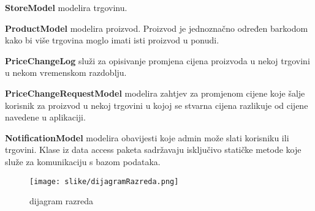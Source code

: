 			\textbf{StoreModel} modelira trgovinu. 
			
			\textbf{ProductModel} modelira proizvod. Proizvod je jednoznačno određen barkodom kako bi više trgovina moglo imati isti proizvod u ponudi. 
			
			\textbf{PriceChangeLog} služi za opisivanje promjena cijena proizvoda u nekoj trgovini u nekom vremenskom razdoblju. 
			
			\textbf{PriceChangeRequestModel} modelira zahtjev za promjenom cijene koje šalje korisnik za proizvod u nekoj trgovini u kojoj se stvarna cijena razlikuje od cijene navedene u aplikaciji.  
			
			\textbf{NotificationModel} modelira obavijesti koje admin može slati korisniku ili trgovini.
Klase iz data access paketa sadržavaju isključivo statičke metode koje služe za komunikaciju s bazom podataka.

\begin{figure}[H]
			\texttt{[image: slike/dijagramRazreda.png]} %
			\caption{dijagram razreda}
			\label{fig:dijagramRazreda} %
			\end{figure}
			
			
			
			
			
			
			
			\eject
		
			
			
			
